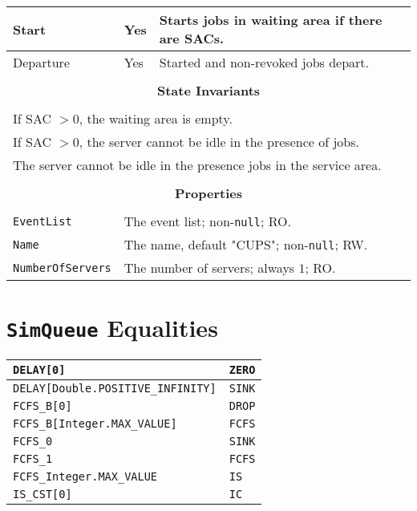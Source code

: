 \documentclass[12pt]{book}
\begin{document}
\begin{tabular}{|l|l|l|}
\hline
Start & Yes & Starts jobs in waiting area if there are SACs. \\
\hline
Departure & Yes & Started and non-revoked jobs depart. \\
\hline
\multicolumn{3}{|c|}{} \\
\multicolumn{3}{|c|}{\bf State  Invariants} \\
\multicolumn{3}{|c|}{} \\
\hline
\multicolumn{3}{|l|}{If SAC $> 0$, the waiting area is empty.} \\
\multicolumn{3}{|l|}{If SAC $> 0$, the server cannot be idle in the presence of jobs.} \\
\multicolumn{3}{|l|}{The server cannot be idle in the presence jobs in the service area.} \\
\hline
\multicolumn{3}{|c|}{} \\
\multicolumn{3}{|c|}{\bf Properties} \\
\multicolumn{3}{|c|}{} \\
\hline
\lstinline|EventList|       & \multicolumn{2}{|l|}{The event list; non-\lstinline|null|; RO.} \\
\hline
\lstinline|Name|            & \multicolumn{2}{|l|}{The name, default "CUPS"; non-\lstinline|null|; RW.} \\
\hline
\lstinline|NumberOfServers| & \multicolumn{2}{|l|}{The number of servers; always $1$; RO.} \\
\hline
\end{tabular}

\section{\lstinline|SimQueue| Equalities}

\begin{tabular}{|l|l|}
\hline
\lstinline|DELAY[0]| & \lstinline|ZERO| \\
\hline
\lstinline|DELAY[Double.POSITIVE_INFINITY]| & \lstinline|SINK| \\
\hline
\lstinline|FCFS_B[0]| & \lstinline|DROP| \\
\hline
\lstinline|FCFS_B[Integer.MAX_VALUE]| & \lstinline|FCFS| \\
\hline
\lstinline|FCFS_0| & \lstinline|SINK| \\
\hline
\lstinline|FCFS_1| & \lstinline|FCFS| \\
\hline
\lstinline|FCFS_Integer.MAX_VALUE| & \lstinline|IS| \\
\hline
\lstinline|IS_CST[0]| & \lstinline|IC| \\
\hline
\end{tabular}
\end{document}
